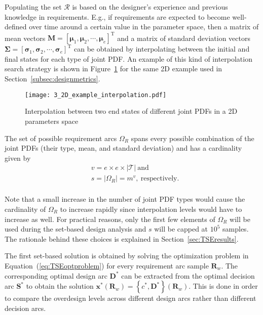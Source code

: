Populating the set $\mathcal{R}$ is based on the designer's experience and previous knowledge in requirements. E.g., if requirements are expected to become well-defined over time around a certain value in the parameter space, then a matrix of mean vectors $\mathbf{M} = \left[\boldsymbol{\mu}_1,\boldsymbol{\mu}_2,\cdots,\boldsymbol{\mu}_e\right]^{\textrm{T}}$ and a matrix of standard deviation vectors $\boldsymbol{\Sigma} = \left[\boldsymbol{\sigma}_1,\boldsymbol{\sigma}_2,\cdots,\boldsymbol{\sigma}_e\right]^{\textrm{T}}$ can be obtained by interpolating between the initial and final states for each type of joint \ac{PDF}. An example of this kind of interpolation search strategy is shown in Figure~\ref{fig:2Dexampleinterp} for the same 2D example used in Section~\ref{subsec:designmetrics}.

\begin{figure}[h!]
	\centering
	\texttt{[image: 3\_2D\_example\_interpolation.pdf]}
	\caption{Interpolation between two end states of different joint \acp{PDF} in a 2D parameters space}
	\label{fig:2Dexampleinterp}
\end{figure}

The set of possible requirement arcs $\Omega_R$ spans every possible combination of the joint \acp{PDF} (their type, mean, and standard deviation) and has a cardinality given by
%
\begin{equation*}
	\begin{aligned}
		& v = e \times e \times |\mathcal{T}|~\mathrm{and}\\
		& s = |\Omega_R| = m^{v},~\mathrm{respectively}.\\
	\end{aligned}
\end{equation*}

Note that a small increase in the number of joint \ac{PDF} types would cause the cardinality of $\Omega_R$ to increase rapidly since interpolation levels would have to increase as well. For practical reasons, only the first few elements of $\Omega_R$ will be used during the set-based design analysis and $s$ will be capped at $10^5$ samples. The rationale behind these choices is explained in Section~\ref{sec:TSEresults}.

The first set-based solution is obtained by solving the optimization problem in Equation~(\ref{eq:TSEoptproblem}) for every requirement arc sample $\mathbf{R}_w$. The corresponding optimal design arc $\mathbf{D}^*$ can be extracted from the optimal decision arc $\mathbf{S}^*$ to obtain the solution $\mathbf{x}^*(\mathbf{R}_w) = \left\{c^*,\mathbf{D}^*\right\}(\mathbf{R}_w)$. This is done in order to compare the overdesign levels across different design arcs rather than different decision arcs.

